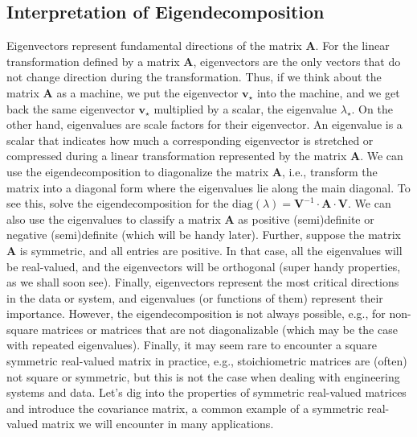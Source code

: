 \documentclass{article}[11pt]
\begin{document}
\subsection{Interpretation of Eigendecomposition}
Eigenvectors represent fundamental directions of the matrix $\mathbf{A}$. For the linear transformation defined by a matrix $\mathbf{A}$, eigenvectors are the only vectors that do not change direction during the transformation. 
Thus, if we think about the matrix $\mathbf{A}$ as a machine, we put the eigenvector $\mathbf{v}_{\star}$ into the machine, and we get back the same eigenvector $\mathbf{v}_{\star}$ multiplied by a scalar, the eigenvalue $\lambda_{\star}$.
On the other hand, eigenvalues are scale factors for their eigenvector. An eigenvalue is a scalar that indicates how much a corresponding eigenvector is stretched or compressed during a linear transformation represented by the matrix $\mathbf{A}$.
We can use the eigendecomposition to diagonalize the matrix $\mathbf{A}$, i.e., transform the matrix into a diagonal form where the eigenvalues lie along the main diagonal. To see this, solve the eigendecomposition for the $\text{diag}(\lambda) = \mathbf{V}^{-1}\cdot\mathbf{A}\cdot\mathbf{V}$. 
We can also use the eigenvalues to classify a matrix $\mathbf{A}$ as positive (semi)definite or negative (semi)definite (which will be handy later). 
Further, suppose the matrix $\mathbf{A}$ is symmetric, and all entries are positive. In that case, all the eigenvalues will be real-valued, and the eigenvectors will be orthogonal (super handy properties, as we shall soon see).
Finally, eigenvectors represent the most critical directions in the data or system, and eigenvalues (or functions of them) represent their importance. 
However, the eigendecomposition is not always possible, e.g., for non-square matrices or matrices that are not diagonalizable (which may be the case with repeated eigenvalues).
Finally, it may seem rare to encounter a square symmetric real-valued matrix in practice, e.g., stoichiometric
matrices are (often) not square or symmetric, but this is not the case when dealing with engineering systems and data.
Let's dig into the properties of symmetric real-valued matrices and introduce the covariance matrix, a common example of a symmetric real-valued matrix we will encounter in many applications.
\end{document}
